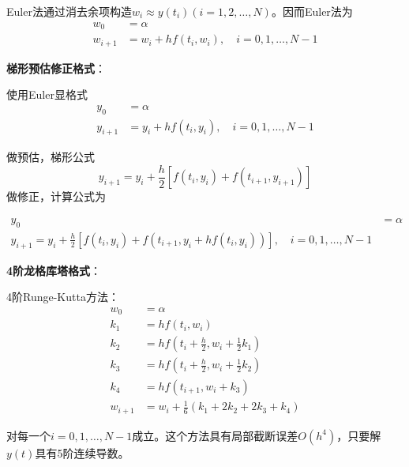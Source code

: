 \documentclass[12pt]{ctexart}
\begin{document}
	Euler法通过消去余项构造$w_i\approx y(t_i)(i=1,2,\dots,N)$。因而Euler法为
	\begin{equation*}
	\begin{aligned}
	w_0&=\alpha \\
	w_{i+1}&=w_i+hf(t_i,w_i),\quad i=0,1,\dots,N-1
	\end{aligned}
	\end{equation*}
	
	\textbf{梯形预估修正格式}：
	
	使用Euler显格式
	\begin{equation*}
	\begin{aligned}
	y_0&=\alpha \\
	y_{i+1}&=y_i+hf(t_i,y_i),\quad i=0,1,\dots,N-1
	\end{aligned}
	\end{equation*}
	
	做预估，梯形公式$$y_{i+1}=y_i+\frac{h}{2}[f(t_i,y_i)+f(t_{i+1},y_{i+1})]$$做修正，计算公式为
	
	\begin{equation*}
	\begin{aligned}
	y_0&=\alpha \\
	y_{i+1}=y_i+\frac{h}{2}[f(t_i,y_i)+f(t_{i+1},y_i+hf(t_i,y_i))],\quad i=0,1,\dots,N-1
	\end{aligned}
	\end{equation*}
	
	\textbf{4阶龙格库塔格式}：
	
	4阶Runge-Kutta方法：
	\begin{equation*}
	\begin{aligned}
	w_0&=\alpha \\
	k_1&=hf(t_i,w_i) \\
	k_2&=hf(t_i+\frac{h}{2},w_i+\frac{1}{2}k_1) \\
	k_3&=hf(t_i+\frac{h}{2},w_i+\frac{1}{2}k_2) \\
	k_4&=hf(t_{i+1},w_i+k_3) \\
	w_{i+1}&=w_i+\frac{1}{6}(k_1+2k_2+2k_3+k_4)
	\end{aligned}
	\end{equation*}
	
	对每一个$i=0,1,\dots,N-1$成立。这个方法具有局部截断误差$O(h^4)$，只要解$y(t)$具有5阶连续导数。
	
\end{document}
